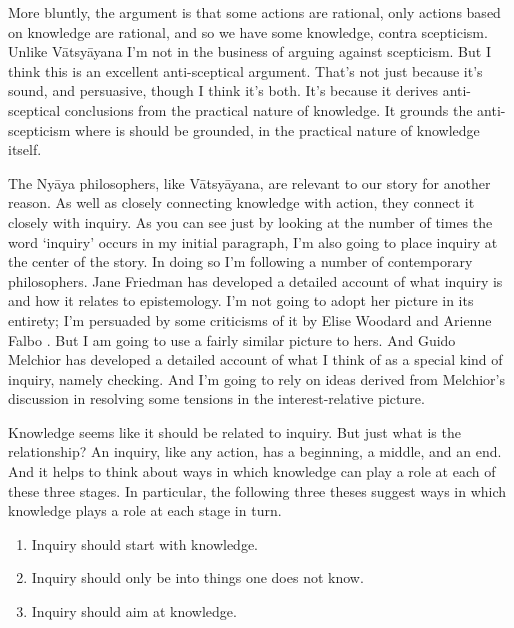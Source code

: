 \documentclass[
  11pt,
]{book}
\providecommand{\tightlist}{%
  \setlength{\itemsep}{0pt}\setlength{\parskip}{0pt}}
\begin{document}
More bluntly, the argument is that some actions are rational, only actions based on knowledge are rational, and so we have some knowledge, contra scepticism. Unlike Vātsyāyana I'm not in the business of arguing against scepticism. But I think this is an excellent anti-sceptical argument. That's not just because it's sound, and persuasive, though I think it's both. It's because it derives anti-sceptical conclusions from the practical nature of knowledge. It grounds the anti-scepticism where is should be grounded, in the practical nature of knowledge itself.

The Nyāya philosophers, like Vātsyāyana, are relevant to our story for another reason. As well as closely connecting knowledge with action, they connect it closely with inquiry. As you can see just by looking at the number of times the word `inquiry' occurs in my initial paragraph, I'm also going to place inquiry at the center of the story. In doing so I'm following a number of contemporary philosophers. Jane Friedman \citetext{\citeyear{Friedman2019a}; \citeyear{Friedman2019b}; \citeyear{Friedman2020}} has developed a detailed account of what inquiry is and how it relates to epistemology. I'm not going to adopt her picture in its entirety; I'm persuaded by some criticisms of it by Elise Woodard \citeyearpar{Woodard2021} and Arienne Falbo \citeyearpar{Falbo2021}. But I am going to use a fairly similar picture to hers. And Guido Melchior \citeyearpar{Melchior2019} has developed a detailed account of what I think of as a special kind of inquiry, namely checking. And I'm going to rely on ideas derived from Melchior's discussion in resolving some tensions in the interest-relative picture.

Knowledge seems like it should be related to inquiry. But just what is the relationship? An inquiry, like any action, has a beginning, a middle, and an end. And it helps to think about ways in which knowledge can play a role at each of these three stages. In particular, the following three theses suggest ways in which knowledge plays a role at each stage in turn.

\begin{enumerate}
\def\labelenumi{\arabic{enumi}.}
\tightlist
\item
  Inquiry should start with knowledge.
\item
  Inquiry should only be into things one does not know.
\item
  Inquiry should aim at knowledge.
\end{enumerate}
\end{document}
